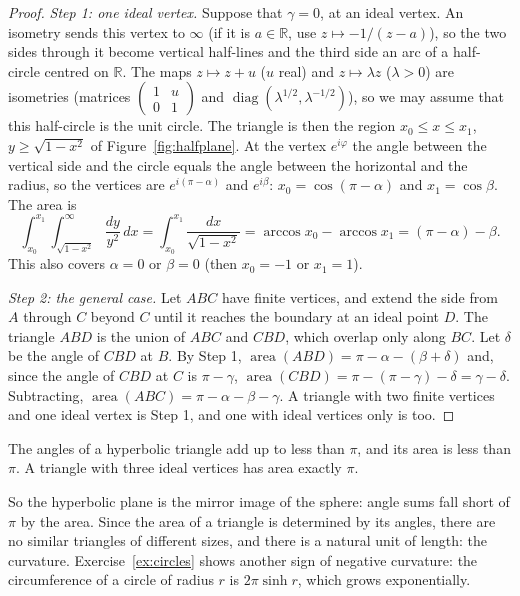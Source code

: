 \begin{proof}
\emph{Step 1: one ideal vertex.} Suppose that $\gamma=0$, at an ideal vertex. An isometry sends this vertex to $\infty$ (if it is $a\in\mathbb R$, use
$z\mapsto-1/(z-a)$), so the two sides through it become vertical half-lines and the third side an arc of a half-circle centred on $\mathbb R$. The maps
$z\mapsto z+u$ ($u$ real) and $z\mapsto\lambda z$ ($\lambda>0$) are isometries (matrices $\begin{pmatrix}1&u\\0&1\end{pmatrix}$ and
$\operatorname{diag}(\lambda^{1/2},\lambda^{-1/2})$), so we may assume that this half-circle is the unit circle. The triangle is then the region
$x_0\le x\le x_1$, $y\ge\sqrt{1-x^2}$ of Figure~\ref{fig:halfplane}. At the vertex $e^{i\varphi}$ the angle between the vertical side and the circle equals the
angle between the horizontal and the radius, so the vertices are $e^{i(\pi-\alpha)}$ and $e^{i\beta}$: $x_0=\cos(\pi-\alpha)$ and $x_1=\cos\beta$. The area is
\[
\int_{x_0}^{x_1}\int_{\sqrt{1-x^2}}^{\infty}\frac{dy}{y^2}\,dx=\int_{x_0}^{x_1}\frac{dx}{\sqrt{1-x^2}}=\arccos x_0-\arccos x_1=(\pi-\alpha)-\beta.
\]
This also covers $\alpha=0$ or $\beta=0$ (then $x_0=-1$ or $x_1=1$).

\emph{Step 2: the general case.} Let $ABC$ have finite vertices, and extend the side from $A$ through $C$ beyond $C$ until it reaches the boundary at an ideal
point $D$. The triangle $ABD$ is the union of $ABC$ and $CBD$, which overlap only along $BC$. Let $\delta$ be the angle of $CBD$ at $B$. By Step 1,
$\operatorname{area}(ABD)=\pi-\alpha-(\beta+\delta)$ and, since the angle of $CBD$ at $C$ is $\pi-\gamma$, $\operatorname{area}(CBD)=\pi-(\pi-\gamma)-\delta=
\gamma-\delta$. Subtracting, $\operatorname{area}(ABC)=\pi-\alpha-\beta-\gamma$. A triangle with two finite vertices and one ideal vertex is Step 1, and one
with ideal vertices only is too.
\end{proof}

\begin{corollary}\label{cor:anglesum}
The angles of a hyperbolic triangle add up to less than $\pi$, and its area is less than $\pi$. A triangle with three ideal vertices has area exactly $\pi$.
\end{corollary}

So the hyperbolic plane is the mirror image of the sphere: angle sums fall short of $\pi$ by the area. Since the area of a triangle is determined by its
angles, there are no similar triangles of different sizes, and there is a natural unit of length: the curvature. Exercise~\ref{ex:circles} shows another
sign of negative curvature: the circumference of a circle of radius $r$ is $2\pi\sinh r$, which grows exponentially.

